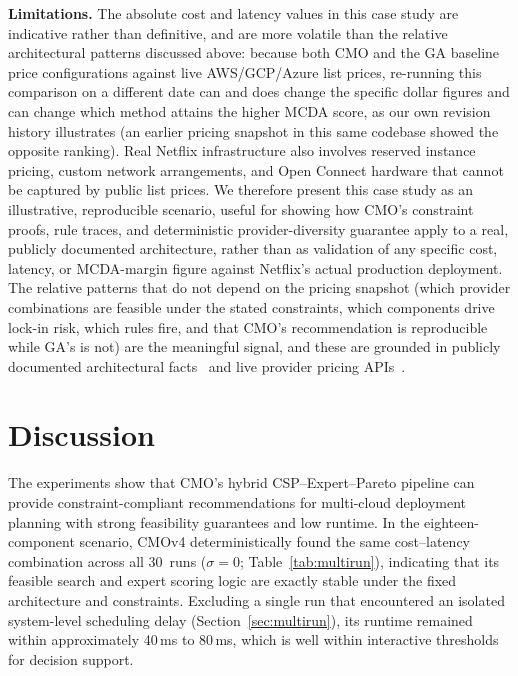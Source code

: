\documentclass[journal]{IEEEtran}
\newcommand{\cmo}{CMO\xspace}
\newcommand{\cmofour}{CMOv4\xspace}
\begin{document}
\textbf{Limitations.}
The absolute cost and latency values in this case study are indicative rather
than definitive, and are more volatile than the relative architectural
patterns discussed above: because both \cmo and the GA baseline price
configurations against live AWS/GCP/Azure list prices, re-running this
comparison on a different date can and does change the specific dollar
figures and can change which method attains the higher MCDA score, as our
own revision history illustrates (an earlier pricing snapshot in this same
codebase showed the opposite ranking). Real Netflix infrastructure also
involves reserved instance pricing, custom network arrangements, and Open
Connect hardware that cannot be captured by public list prices. We therefore
present this case study as an illustrative, reproducible scenario, useful
for showing how \cmo's constraint proofs, rule traces, and deterministic
provider-diversity guarantee apply to a real, publicly documented
architecture, rather than as validation of any specific cost, latency, or
MCDA-margin figure against Netflix's actual production deployment. The
relative patterns that do not depend on the pricing snapshot (which
provider combinations are feasible under the stated constraints, which
components drive lock-in risk, which rules fire, and that \cmo's recommendation
is reproducible while GA's is not) are the meaningful signal, and these
are grounded in publicly documented architectural
facts~\cite{aws_netflix,netflix_techblog,netflix_zuul,netflix_atlas,netflix_titus,netflix_openconnect}
and live provider pricing APIs~\cite{aws_pricing,azure_prices,gcp_pricing}.

\section{Discussion}
\label{sec:discussion}

The experiments show that \cmo's hybrid CSP--Expert--Pareto pipeline can provide
constraint-compliant recommendations for multi-cloud deployment planning with
strong feasibility guarantees and low runtime. In the eighteen-component
scenario, \cmofour deterministically found the same cost--latency combination
across all 30~runs ($\sigma=0$; Table~\ref{tab:multirun}), indicating that its
feasible search and expert scoring logic are exactly stable under the fixed
architecture and constraints. Excluding a single run that encountered an
isolated system-level scheduling delay (Section~\ref{sec:multirun}), its
runtime remained within approximately 40\,ms to 80\,ms, which is well within
interactive thresholds for decision support.
\end{document}
